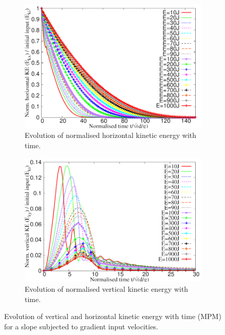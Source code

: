 \documentclass[3p,times,procedia,number]{elsarticle}
\begin{document}
\begin{figure}[tbhp]
  \centering
  \begin{subfigure}[b]{0.4\textwidth}
    \includegraphics[width=\textwidth]{figs/Normalised_KEx_Slope}
    \caption{Evolution of normalised horizontal kinetic energy with time.}
    \label{fig:Normalised_KEx_Slope}
  \end{subfigure}
  \begin{subfigure}[b]{0.4\textwidth}
    \centering
    \includegraphics[width=\textwidth]{figs/Normalised_KEy_Slope}
    \caption{Evolution of normalised vertical kinetic energy with time.}
    \label{fig:Normalised_KEy_Slope}
  \end{subfigure}
  \caption{Evolution of vertical and horizontal kinetic energy with time (MPM) 
  for a slope subjected to gradient input velocities.}
  \label{fig:Normalised_KEx_KEy_Slope}
\end{figure}
\end{document}
